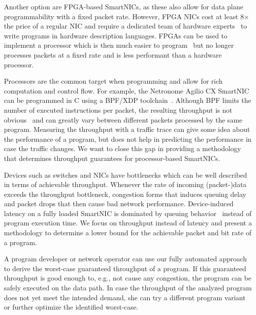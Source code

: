 \documentclass[sigconf,screen,authordraft]{acmart}
\newcommand{\eg}{e.g.,}
\begin{document}
Another option are FPGA-based SmartNICs, as these also allow for data plane programmability with a fixed packet rate.
However, FPGA NICs cost at least 8$\times$ the price of a regular NIC and require a dedicated team of hardware experts~\cite{hXDP,accelnet} to write programs in hardware description languages.
FPGAs can be used to implement a processor which is then much easier to program~\cite{hXDP} but no longer processes packets at a fixed rate and is less performant than a hardware processor.

Processors are the common target when programming and allow for rich computation and control flow.
For example, the Netronome Agilio CX SmartNIC can be programmed in C using a BPF/XDP toolchain~\cite{XDP,XDP-offload}.
Although BPF limits the number of executed instructions per packet, the resulting throughput is not obvious~\cite{XDP} and can greatly vary between different packets processed by the same program.
Measuring the throughput with a traffic trace can give some idea about the performance of a program, but does not help in predicting the performance in case the traffic changes.
We want to close this gap in providing a methodology that determines throughput guarantees for processor-based SmartNICs.

Devices such as switches and NICs have bottlenecks which can be well described in terms of achievable throughput.
Whenever the rate of incoming (packet-)data exceeds the throughput bottleneck, congestion forms that induces queuing delay and packet drops that then cause bad network performance.
Device-induced latency on a fully loaded SmartNIC is dominated by queuing behavior~\cite{xdp-performance,iPipe} instead of program execution time.
We focus on throughput instead of latency and present a methodology to determine a lower bound for the achievable packet and bit rate of a program.

A program developer or network operator can use our fully automated approach to derive the worst-case guaranteed throughput of a program.
If this guaranteed throughput is good enough to, \eg{} not cause any congestion, the program can be safely executed on the data path.
In case the throughput of the analyzed program does not yet meet the intended demand, she can try a different program variant or further optimize the identified worst-case.
\end{document}
